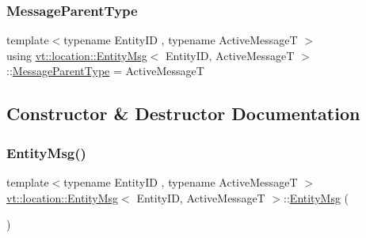 \subsubsection{\texorpdfstring{Message\+Parent\+Type}{MessageParentType}}
{\footnotesize\ttfamily template$<$typename Entity\+ID , typename Active\+MessageT $>$ \\
using \hyperlink{structvt_1_1location_1_1_entity_msg}{vt\+::location\+::\+Entity\+Msg}$<$ Entity\+ID, Active\+MessageT $>$\+::\hyperlink{structvt_1_1location_1_1_entity_msg_a186637100a628eb04cb00127f5579210}{Message\+Parent\+Type} =  Active\+MessageT}



\subsection{Constructor \& Destructor Documentation}
\mbox{\label{structvt_1_1location_1_1_entity_msg_a962b4711acd88b3be14cde800dcfe967}} 
\subsubsection{\texorpdfstring{Entity\+Msg()}{EntityMsg()}\hspace{0.1cm}{\footnotesize\ttfamily [1/2]}}
{\footnotesize\ttfamily template$<$typename Entity\+ID , typename Active\+MessageT $>$ \\
\hyperlink{structvt_1_1location_1_1_entity_msg}{vt\+::location\+::\+Entity\+Msg}$<$ Entity\+ID, Active\+MessageT $>$\+::\hyperlink{structvt_1_1location_1_1_entity_msg}{Entity\+Msg} (\begin{DoxyParamCaption}{ }\end{DoxyParamCaption})\hspace{0.3cm}{\ttfamily [default]}}

\mbox{\label{structvt_1_1location_1_1_entity_msg_a20a8679b67ce88ab88d2fd915dae6d23}} 
